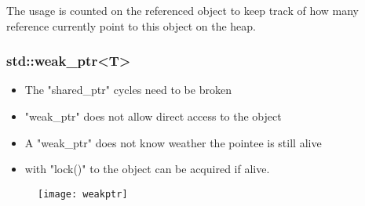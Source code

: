 The usage is counted on the referenced object to keep track of how many reference currently point to this object on the heap.

\subsubsection{std::weak\_ptr<T>}
\begin{itemize}
  \itemsep -0.5em 
  \item The "shared\_ptr" cycles need to be broken
  \item "weak\_ptr" does not allow direct access to the object
  \item A "weak\_ptr" does not know weather the pointee is still alive
  \item with "lock()" to the object can be acquired if alive. 
\end{itemize}

\begin{figure}[h!]
  \centering
  \texttt{[image: weakptr]}
  \caption{}
\end{figure}
